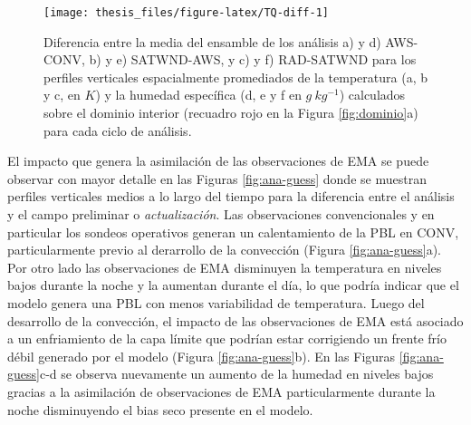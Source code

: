 \documentclass[12pt,oneside,a4paper]{reedthesis}
\begin{document}
\begin{figure}

{\centering \texttt{[image: thesis\_files/figure-latex/TQ-diff-1]} 

}

\caption{Diferencia entre la media del ensamble de los análisis a) y d) AWS-CONV, b) y e) SATWND-AWS, y c) y f) RAD-SATWND para los perfiles verticales espacialmente promediados de la temperatura (a, b y c, en \(K\)) y la humedad específica (d, e y f en \(g\ kg^{-1}\)) calculados sobre el dominio interior (recuadro rojo en la Figura \ref{fig:dominio}a) para cada ciclo de análisis.}\label{fig:TQ-diff}
\end{figure}
El impacto que genera la asimilación de las observaciones de EMA se puede observar con mayor detalle en las Figuras \ref{fig:ana-guess} donde se muestran perfiles verticales medios a lo largo del tiempo para la diferencia entre el análisis y el campo preliminar o \emph{actualización}. Las observaciones convencionales y en particular los sondeos operativos generan un calentamiento de la PBL en CONV, particularmente previo al derarrollo de la convección (Figura \ref{fig:ana-guess}a). Por otro lado las observaciones de EMA disminuyen la temperatura en niveles bajos durante la noche y la aumentan durante el día, lo que podría indicar que el modelo genera una PBL con menos variabilidad de temperatura. Luego del desarrollo de la convección, el impacto de las observaciones de EMA está asociado a un enfriamiento de la capa límite que podrían estar corrigiendo un frente frío débil generado por el modelo (Figura \ref{fig:ana-guess}b). En las Figuras \ref{fig:ana-guess}c-d se observa nuevamente un aumento de la humedad en niveles bajos gracias a la asimilación de observaciones de EMA particularmente durante la noche disminuyendo el bias seco presente en el modelo.
\end{document}
